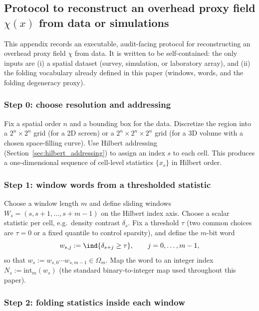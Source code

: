 \subsection{Protocol to reconstruct an overhead proxy field \texorpdfstring{$\chi(x)$}{chi(x)} from data or simulations}
\label{app:chi_reconstruction_protocol}

This appendix records an executable, audit-facing protocol for reconstructing an overhead proxy field $\chi$ from data.
It is written to be self-contained: the only inputs are (i) a spatial dataset (survey, simulation, or laboratory array), and (ii) the folding vocabulary already defined in this paper (windows, words, and the folding degeneracy proxy).

\subsubsection{Step 0: choose resolution and addressing}
\label{subsec:chi_step0}

Fix a spatial order $n$ and a bounding box for the data.
Discretize the region into a $2^n\times 2^n$ grid (for a 2D screen) or a $2^n\times 2^n\times 2^n$ grid (for a 3D volume with a chosen space-filling curve).
Use Hilbert addressing (Section~\ref{sec:hilbert_addressing}) to assign an index $s$ to each cell.
This produces a one-dimensional sequence of cell-level statistics $\{x_s\}$ in Hilbert order.

\subsubsection{Step 1: window words from a thresholded statistic}
\label{subsec:chi_step1_words}

Choose a window length $m$ and define sliding windows $W_s=(s,s+1,\dots,s+m-1)$ on the Hilbert index axis.
Choose a scalar statistic per cell, e.g.\ density contrast $\delta_s$.
Fix a threshold $\tau$ (two common choices are $\tau=0$ or a fixed quantile to control sparsity), and define the $m$-bit word
\[
w_{s,j}:=\ind\{\delta_{s+j}\ge \tau\},\qquad j=0,\dots,m-1,
\]
so that $w_s:=w_{s,0}\cdots w_{s,m-1}\in\Omega_m$.
Map the word to an integer index $N_s:=\mathrm{int}_m(w_s)$ (the standard binary-to-integer map used throughout this paper).

\subsubsection{Step 2: folding statistics inside each window}
\label{subsec:chi_step2_stats}

